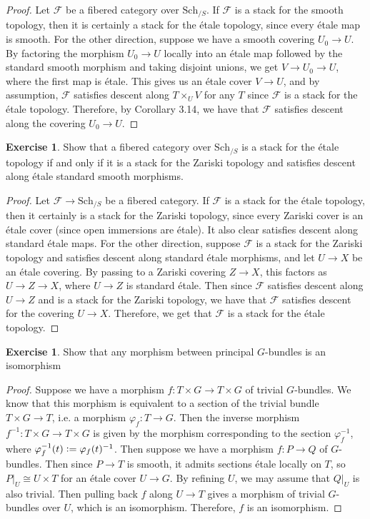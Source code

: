 \documentclass[psamsfonts, 12pt]{amsart}
\theoremstyle{definition}
\newtheorem{exer}[thm]{Exercise}
\theoremstyle{remark}
\newcommand{\inv}{^{-1}}
\newcommand{\defeq}{\vcentcolon=}
\begin{document}
\begin{proof}
Let $\mathcal{F}$ be a fibered category over $\mathrm{Sch}_{/S}$. If $\mathcal{F}$
is a stack for the smooth topology, then it is certainly a stack for the \'etale
topology, since every \'etale map is smooth. For the other direction, suppose
we have a smooth covering $U_0 \to U$. By factoring the morphism $U_0 \to U$ locally
into an \'etale map followed by the standard smooth morphism and taking disjoint
unions, we get $V \to U_0 \to U$, where the first map is \'etale. This gives us
an \'etale cover $V \to U$, and by assumption, $\mathcal{F}$ satisfies descent along
$T \times_U V$ for any $T$ since $\mathcal{F}$ is a stack for the \'etale topology.
Therefore, by Corollary 3.14, we have that $\mathcal{F}$ satisfies descent along
the covering $U_0 \to U$.
\end{proof}
%
\begin{exer}
Show that a fibered category over $\mathrm{Sch}_{/S}$ is a stack for the \'etale
topology if and only if it is a stack for the Zariski topology and satisfies descent
along \'etale standard smooth morphisms.
\end{exer}
%
\begin{proof}
Let $\mathcal{F} \to \mathrm{Sch}_{/S}$ be a fibered category. If $\mathcal{F}$ is
a stack for the \'etale topology, then it certainly is a stack for the Zariski
topology, since every Zariski cover is an \'etale cover (since open immersions
are \'etale). It also clear satisfies descent along standard \'etale maps. For the
other direction, suppose $\mathcal{F}$ is a stack for the Zariski topology and
satisfies descent along standard \'etale morphisms, and let $U \to X$ be an
\'etale covering. By passing to a Zariski covering $Z \to X$, this factors
as $U \to Z \to X$, where $U \to Z$ is standard \'etale. Then since $\mathcal{F}$
satisfies descent along $U \to Z$ and is a stack for the Zariski topology, we have
that $\mathcal{F}$ satisfies descent for the covering $U \to X$. Therefore, we get
that $\mathcal{F}$ is a stack for the \'etale topology.
\end{proof}
%
\setcounter{section}{5}
%
\setcounter{thm}{2}
%
\begin{exer}
Show that any morphism between principal $G$-bundles is an isomorphism
\end{exer}
%
\begin{proof}
Suppose we have a morphism $f : T \times G \to T \times G$ of trivial $G$-bundles.
We know that this morphism is equivalent to a section of the trivial bundle
$T \times G \to T$, i.e. a morphism $\varphi_f : T \to G$. Then the inverse
morphism $f\inv : T\times G \to T \times G$ is given by the morphism corresponding
to the section $\varphi_f\inv$, where $\varphi_f\inv(t) \defeq \varphi_f(t)\inv$.
Then suppose we have a morphism $f : P \to Q$ of $G$-bundles. Then since $P \to T$ is
smooth, it admits sections \'etale locally on $T$, so $P\vert_U \cong U \times T$ for
an \'etale cover $U \to G$. By refining $U$, we may assume that $Q\vert_U$ is also
trivial. Then pulling back $f$ along $U \to T$ gives a morphism of trivial $G$-bundles
over $U$, which is an isomorphism. Therefore, $f$ is an isomorphism.
\end{proof}
\end{document}
